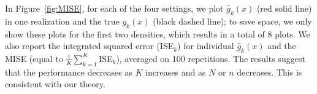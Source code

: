 \documentclass[preprint,11pt]{article}
\def\r#1{\textcolor{red}{\bf #1}}
\numberwithin{equation}{section}
\begin{document}

In Figure~\ref{fig:MISE}, for each of the four settings, we plot $\hat{g}_k(x)$ (red solid line) in one realization and the true $g_k(x)$ (black dashed line); to save space, we only show these plots for the first two densities, which results in a total of 8 plots. We also report  the integrated squared error (ISE$_k$) for individual $\hat{g}_k(x)$ and the MISE (equal to $\frac{1}{K}\sum_{k=1}^K$ISE$_k$), averaged on 100 repetitions. 
%
The results suggest that the performance decreases as $K$ increases and as $N$ or $n$ decreases. This is consistent with our theory.  
\end{document}
